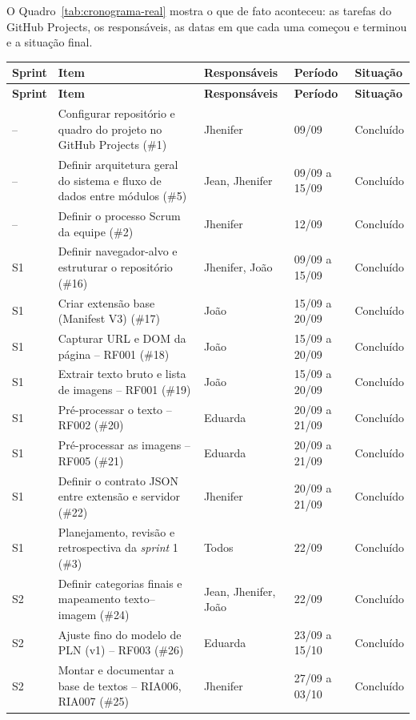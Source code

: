 \documentclass[
    12pt,           %
    oneside,        %
    a4paper,        %
    chapter=TITLE,  %
    english,        %
    brazil          %
]{abntex2}
\begin{document}
O Quadro~\ref{tab:cronograma-real} mostra o que de fato aconteceu: as
tarefas do GitHub Projects, os responsáveis, as datas em que cada uma começou
e terminou e a situação final.
{\small
\begin{longtable}{|p{1.3cm}|p{6.4cm}|p{2.6cm}|p{2.0cm}|p{1.5cm}|}
\hline
\textbf{Sprint} & \textbf{Item} & \textbf{Responsáveis} & \textbf{Período} & \textbf{Situação} \\ \hline
\endfirsthead
\hline
\textbf{Sprint} & \textbf{Item} & \textbf{Responsáveis} & \textbf{Período} & \textbf{Situação} \\ \hline
\endhead
-- & Configurar repositório e quadro do projeto no GitHub Projects (\#1) & Jhenifer & 09/09 & Concluído \\ \hline
-- & Definir arquitetura geral do sistema e fluxo de dados entre módulos (\#5) & Jean, Jhenifer & 09/09 a 15/09 & Concluído \\ \hline
-- & Definir o processo Scrum da equipe (\#2) & Jhenifer & 12/09 & Concluído \\ \hline
S1 & Definir navegador-alvo e estruturar o repositório (\#16) & Jhenifer, João & 09/09 a 15/09 & Concluído \\ \hline
S1 & Criar extensão base (Manifest V3) (\#17) & João & 15/09 a 20/09 & Concluído \\ \hline
S1 & Capturar URL e DOM da página -- RF001 (\#18) & João & 15/09 a 20/09 & Concluído \\ \hline
S1 & Extrair texto bruto e lista de imagens -- RF001 (\#19) & João & 15/09 a 20/09 & Concluído \\ \hline
S1 & Pré-processar o texto -- RF002 (\#20) & Eduarda & 20/09 a 21/09 & Concluído \\ \hline
S1 & Pré-processar as imagens -- RF005 (\#21) & Eduarda & 20/09 a 21/09 & Concluído \\ \hline
S1 & Definir o contrato JSON entre extensão e servidor (\#22) & Jhenifer & 20/09 a 21/09 & Concluído \\ \hline
S1 & Planejamento, revisão e retrospectiva da \textit{sprint} 1 (\#3) & Todos & 22/09 & Concluído \\ \hline
S2 & Definir categorias finais e mapeamento texto--imagem (\#24) & Jean, Jhenifer, João & 22/09 & Concluído \\ \hline
S2 & Ajuste fino do modelo de PLN (v1) -- RF003 (\#26) & Eduarda & 23/09 a 15/10 & Concluído \\ \hline
S2 & Montar e documentar a base de textos -- RIA006, RIA007 (\#25) & Jhenifer & 27/09 a 03/10 & Concluído \\ \hline

\end{longtable}}
\end{document}
